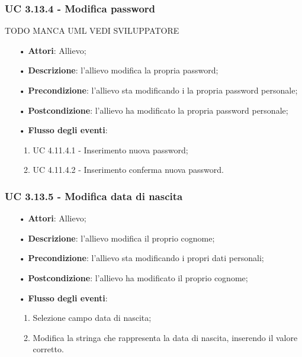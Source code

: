\subsubsection{UC 3.13.4 - Modifica password}
{\huge TODO MANCA UML VEDI SVILUPPATORE}
\begin{figure}[H]
	\centering
\end{figure}
\begin{itemize}
	\item[•]\textbf{Attori}: Allievo;
	\item[•]\textbf{Descrizione}: l'allievo modifica la propria password;
	\item[•]\textbf{Precondizione}: l'allievo sta modificando i la propria password personale;
	\item[•]\textbf{Postcondizione}: l'allievo ha modificato la propria password personale; 
	\item[•]\textbf{Flusso degli eventi}: 
	\begin{enumerate}
		\item UC 4.11.4.1 - Inserimento nuova password;
		\item UC 4.11.4.2 - Inserimento conferma nuova password.
	\end{enumerate}
\end{itemize}
\subsubsection{UC 3.13.5 - Modifica data di nascita}
\begin{itemize}
	\item[•]\textbf{Attori}: Allievo;
	\item[•]\textbf{Descrizione}: l'allievo modifica il proprio cognome;
	\item[•]\textbf{Precondizione}: l'allievo sta modificando i propri dati personali;
	\item[•]\textbf{Postcondizione}: l'allievo ha modificato il proprio cognome; 
	\item[•]\textbf{Flusso degli eventi}: 
	\begin{enumerate}
		\item Selezione campo data di nascita;
		\item Modifica la stringa che rappresenta la data di nascita, inserendo il valore corretto.
	\end{enumerate}
\end{itemize}

